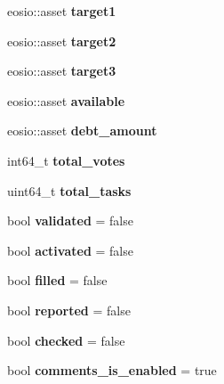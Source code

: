 \begin{DoxyCompactItemize}
\mbox{\label{structgoals_aa60c4415980afa5747628a8487bf57db}} 
eosio\+::asset {\bfseries target1}
\item 
\mbox{\label{structgoals_a0d8f605a8ef5b750312a4ef25447e8c5}} 
eosio\+::asset {\bfseries target2}
\item 
\mbox{\label{structgoals_a0c7e1384356a6092cc92dfb5c86e23cb}} 
eosio\+::asset {\bfseries target3}
\item 
\mbox{\label{structgoals_a833e3922b9ed3788cdac61c3762d15ce}} 
eosio\+::asset {\bfseries available}
\item 
\mbox{\label{structgoals_a50c7f7557639a42246ae4a75c986b881}} 
eosio\+::asset {\bfseries debt\+\_\+amount}
\item 
\mbox{\label{structgoals_a3b02eb227e5e2bd30439fcdb425825c9}} 
int64\+\_\+t {\bfseries total\+\_\+votes}
\item 
\mbox{\label{structgoals_a5557be4e2582c641a4d8971eed91dd81}} 
uint64\+\_\+t {\bfseries total\+\_\+tasks}
\item 
\mbox{\label{structgoals_ac3efbc316b87f181069e6eaae900a29b}} 
bool {\bfseries validated} = false
\item 
\mbox{\label{structgoals_afd5c299ccd909ab3acc36d257d019a0b}} 
bool {\bfseries activated} = false
\item 
\mbox{\label{structgoals_a7180729ad741602e1be314c90b833782}} 
bool {\bfseries filled} = false
\item 
\mbox{\label{structgoals_a027698ac11a5d8e177ed41a7a22c5a79}} 
bool {\bfseries reported} = false
\item 
\mbox{\label{structgoals_a66e73d88208e0db0cefc7eae005ceb77}} 
bool {\bfseries checked} = false
\item 
\mbox{\label{structgoals_af0cdb2a4a5b26b5cc5b4b703979f0b15}} 
bool {\bfseries comments\+\_\+is\+\_\+enabled} = true

\end{DoxyCompactItemize}
